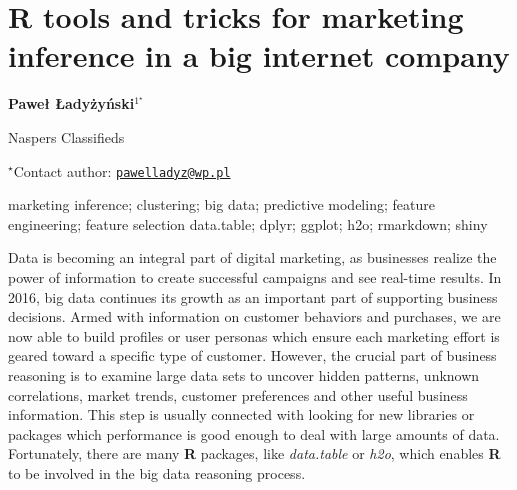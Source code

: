 \documentclass[\main/boa.tex]{subfiles}
\begin{document}
\section{R tools and tricks for marketing inference in a big internet company}

\begin{center}
  {\bf Paweł Ładyżyński$^{1^\star}$}
\end{center}

\vskip 0.3cm

\begin{affiliations}
\begin{enumerate}
\begin{minipage}{0.915\textwidth}
\centering
\item Naspers Classifieds \\[-2pt]
\end{minipage}
\end{enumerate}
$^\star$Contact author: \href{mailto:pawelladyz@wp.pl}{\nolinkurl{pawelladyz@wp.pl}}\\
\end{affiliations}

\vskip 0.5cm

\begin{minipage}{0.915\textwidth}
\keywords marketing inference; clustering; big data; predictive modeling; feature
engineering; feature selection
\packages data.table; dplyr; ggplot; h2o; rmarkdown; shiny
\end{minipage}

\vskip 0.8cm

Data is becoming an integral part of digital marketing, as businesses
realize the power of information to create successful campaigns and see
real-time results. In 2016, big data continues its growth as an
important part of supporting business decisions. Armed with information
on customer behaviors and purchases, we are now able to build profiles
or user personas which ensure each marketing effort is geared toward a
specific type of customer. However, the crucial part of business
reasoning is to examine large data sets to uncover hidden patterns,
unknown correlations, market trends, customer preferences and other
useful business information. This step is usually connected with looking
for new libraries or packages which performance is good enough to deal
with large amounts of data. Fortunately, there are many \textbf{R}
packages, like \emph{data.table} or \emph{h2o}, which enables \textbf{R}
to be involved in the big data reasoning process.
\end{document}
